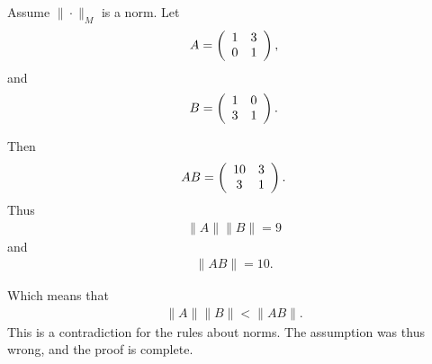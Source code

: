 \documentclass[10pt]{article}
\begin{document}
\begin{solution}[5]  \label{sol:5}
Assume \(\| \cdot \| _{M}\) is a norm.
Let
\begin{align*}
A =
\left( \begin{array}{c c}
1  &  3 \\
0  &  1 
\end{array} \right)
,
\end{align*}
and
\begin{align*}
B =
\left( \begin{array}{c c}
1  &  0 \\
3  &  1
\end{array} \right)
.
\end{align*}

Then
\begin{align*}
AB =
\left( \begin{array}{c c}
10  &  3 \\
3  &  1
\end{array} \right)
.
\end{align*}
Thus
\begin{align*}
\| A \| \| B \| = 9
\end{align*}
and
\begin{align*}
\| AB \| = 10
.
\end{align*}

Which means that
\begin{align*}
\| A \| \| B \| < \| AB \| 
.
\end{align*}
This is a contradiction for the rules about norms. The assumption
was thus wrong, and the proof is complete.
\end{solution}
\end{document}
